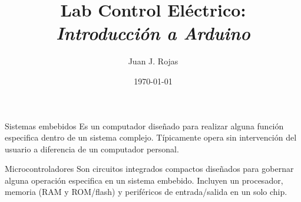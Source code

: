 \documentclass[aspectratio=169]{beamer}
\title{Lab Control Eléctrico: \\ \emph{Introducción a Arduino}}
\author{
    Juan J. Rojas
}
\institute{Instituto Tecnológico de Costa Rica}
\date{\today}
\begin{document}

\maketitle

\newcommand{\blackandwhite}{white} %


\begin{frame}[t]{Sistemas embebidos}
Es un computador diseñado para realizar alguna función especifica dentro de un sistema complejo. Típicamente opera sin intervención del usuario a diferencia de un computador personal.  

\end{frame}

\begin{frame}[t]{Microcontroladores}
Son circuitos integrados compactos diseñados para gobernar alguna operación especifica en un sistema embebido. Incluyen un procesador, memoria (RAM y ROM/flash) y periféricos de entrada/salida en un solo chip.

\end{frame}
\end{document}
